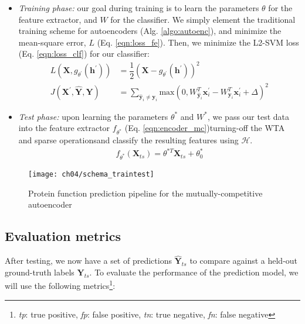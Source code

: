 \begin{itemize}
  \item \textit{Training phase:} our goal during training is to learn the
  parameters $\theta$ for the feature extractor, and $W$ for the classifier.
  We simply element the traditional training scheme for autoencoders (Alg.
  \ref{algo:autoenc}), and minimize the mean-square error, $L$ (Eq.
  \ref{eqn:loss_fe}). Then, we minimize the L2-SVM loss (Eq.
  \ref{eqn:loss_clf}) for our classifier:
  \begin{align}
    \label{eqn:loss_fe}
    L(\mathbf{X},g_{\theta^{\prime}}(\mathbf{h}^{\prime})) &=
      \dfrac{1}{2}(\mathbf{X} - g_{\theta^{\prime}}(\mathbf{h}^{\prime}))^{2}\\
    \label{eqn:loss_clf}
    J(\mathbf{X}^{\prime}, \widehat{\mathbf{Y}}, \mathbf{Y}) &= \sum_{\widehat{\mathbf{y}}_i \neq \mathbf{y}_{i}} \text{max}(0, W^{T}_{\widehat{\mathbf{y}}_{i}} \mathbf{x}_{i}^{\prime} - W^{T}_{\mathbf{y}_i}\mathbf{x}^{\prime}_i + \Delta)^2
  \end{align}
  \item \textit{Test phase:} upon learning the parameters $\theta^{\ast}$ and
  $W^{\ast}$, we pass our test data into the feature extractor
  $f_{\theta^{\ast}}$ (Eq. \ref{eqn:encoder_mc})\textemdash turning-off the WTA and sparse
  operations\textemdash and classify the resulting features using
  $\mathcal{H}$.
  \begin{align}
    \label{eqn:encoder_mc}
    f_{\theta^{\ast}}(\mathbf{X}_{ts}) = \theta^{\ast T} \mathbf{X}_{ts} + \theta_{0}^{\ast}
  \end{align}
\end{itemize}

\begin{figure}[!h]
  \centering
  \texttt{[image: ch04/schema\_traintest]}
  \caption[Protein function prediction pipeline]{Protein function prediction
  pipeline for the mutually-competitive autoencoder}
  \label{schema:traintest_mc}
\end{figure}

\newpage
\subsection{Evaluation metrics}

After testing, we now have a set of predictions $\mathbf{\widehat{Y}}_{ts}$
to compare against a held-out ground-truth labels $\mathbf{Y}_{ts}$. To
evaluate the performance of the prediction model, we will use the following
metrics\footnote[2]{\textit{tp}: true positive, \textit{fp}: false positive,
\textit{tn}: true negative, \textit{fn}: false negative}:

